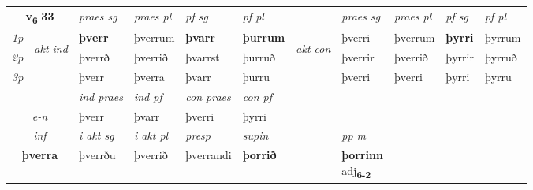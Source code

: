 \noindent
\begin{tabular}{lllllllllll} \toprule
\multicolumn{2}{c}{\textbf{v{\textsubscript{6}}} \Large{\textbf{33}}}  &  \textit{praes sg}  & \textit{praes pl}  &\textit{ pf sg} & \textit{pf pl} &  &  \textit{praes sg}  & \textit{praes pl}  & \textit{pf sg} & \textit{pf pl } \\*
	\cmidrule{3-6} \cmidrule{8-11}
 {\textit{1p}} & \multirow{3}{*}{\begin{turn}{90}\textit{akt ind}\end{turn}} & \textbf{þverr} & þverrum & \textbf{þvarr} & \textbf{þurrum} & \multirow{3}{*}{\begin{turn}{90}\textit{akt con}\end{turn}} &þverri & þverrum & \textbf{þyrri} & þyrrum\\*
 {\textit{2p}} &  &  þverrð  & þverrið & þvarrst & þurruð & & þverrir & þverrið & þyrrir & þyrruð \\*
{\textit{3p}} &  & þverr & þverra & þvarr & þurru & & þverri & þverri& þyrri & þyrru \\*
\cmidrule{3-6} \cmidrule{8-11}

   & &  \textit{ind praes} & \textit{ind pf} & \textit{con praes} & \textit{con pf} \\*
\multicolumn{2}{c}{ \textit{e-n} } & þverr & þvarr & þverri & þyrri \\*

\cmidrule{3-8}
   \multicolumn{2}{c}{\textit{inf}}  & \textit{i akt sg} & \textit{i akt pl}   & \textit{presp} & \textit{supin}  && \textit{pp m} \\*
  \multicolumn{2}{c}{\textbf{þverra}} & þverrðu  & þverrið   & þverrandi &  \textbf{þorrið}  && \specialcell{\textbf{þorrinn} \\ adj\textbf{\textsubscript{6-2}}} \\*
\end{tabular}

